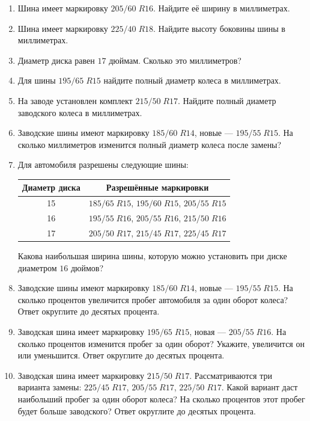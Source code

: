 \documentclass[a4paper,12pt]{article}
\begin{document}
\begin{enumerate}
  \item Шина имеет маркировку \(205/60\;R16\). Найдите её ширину в миллиметрах.

  \item Шина имеет маркировку \(225/40\;R18\). Найдите высоту боковины шины в миллиметрах.

  \item Диаметр диска равен \(17\) дюймам. Сколько это миллиметров?

  \item Для шины \(195/65\;R15\) найдите полный диаметр колеса в миллиметрах.

  \item На заводе установлен комплект \(215/50\;R17\). Найдите полный диаметр заводского колеса в миллиметрах.

  \item Заводские шины имеют маркировку \(185/60\;R14\), новые --- \(195/55\;R15\). На сколько миллиметров изменится полный диаметр колеса после замены?

  \item Для автомобиля разрешены следующие шины:
  \begin{center}
  \begin{tabular}{c c}
  \toprule
  Диаметр диска & Разрешённые маркировки \\
  \midrule
  15 & \(185/65\;R15\), \(195/60\;R15\), \(205/55\;R15\) \\
  16 & \(195/55\;R16\), \(205/55\;R16\), \(215/50\;R16\) \\
  17 & \(205/50\;R17\), \(215/45\;R17\), \(225/45\;R17\) \\
  \bottomrule
  \end{tabular}
  \end{center}
  Какова наибольшая ширина шины, которую можно установить при диске диаметром \(16\) дюймов?

  \item Заводские шины имеют маркировку \(185/60\;R14\), новые --- \(195/55\;R15\). На сколько процентов увеличится пробег автомобиля за один оборот колеса? Ответ округлите до десятых процента.

  \item Заводская шина имеет маркировку \(195/65\;R15\), новая --- \(205/55\;R16\). На сколько процентов изменится пробег за один оборот? Укажите, увеличится он или уменьшится. Ответ округлите до десятых процента.

  \item Заводская шина имеет маркировку \(215/50\;R17\). Рассматриваются три варианта замены: \(225/45\;R17\), \(205/55\;R17\), \(225/50\;R17\). Какой вариант даст наибольший пробег за один оборот колеса? На сколько процентов этот пробег будет больше заводского? Ответ округлите до десятых процента.
\end{enumerate}
\end{document}
